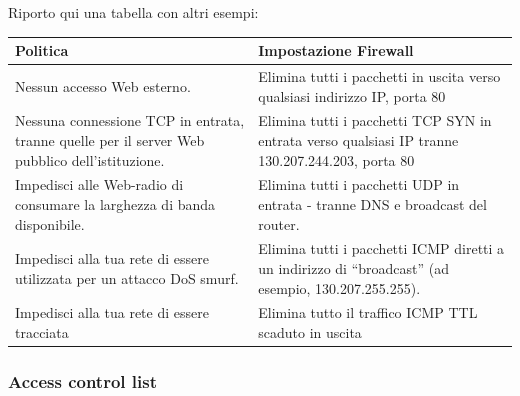 Riporto qui una tabella con altri esempi:
\begin{center}
    \begin{tabularx}{\textwidth}{|X|X|}
        \hline
        \textbf{Politica} & \textbf{Impostazione Firewall} \\
        \hline
        Nessun accesso Web esterno. & Elimina tutti i pacchetti in uscita verso qualsiasi indirizzo IP, porta 80 \\
        \hline
        Nessuna connessione TCP in entrata, tranne quelle per il server Web pubblico dell'istituzione. & Elimina tutti i pacchetti TCP SYN in entrata verso qualsiasi IP tranne 130.207.244.203, porta 80 \\
        \hline
        Impedisci alle Web-radio di consumare la larghezza di banda disponibile. & Elimina tutti i pacchetti UDP in entrata - tranne DNS e broadcast del router. \\
        \hline
        Impedisci alla tua rete di essere utilizzata per un attacco DoS smurf. & Elimina tutti i pacchetti ICMP diretti a un indirizzo di “broadcast” (ad esempio, 130.207.255.255). \\
        \hline
        Impedisci alla tua rete di essere tracciata & Elimina tutto il traffico ICMP TTL scaduto in uscita \\
        \hline
        \end{tabularx}
\end{center}

\subsubsection{Access control list}

